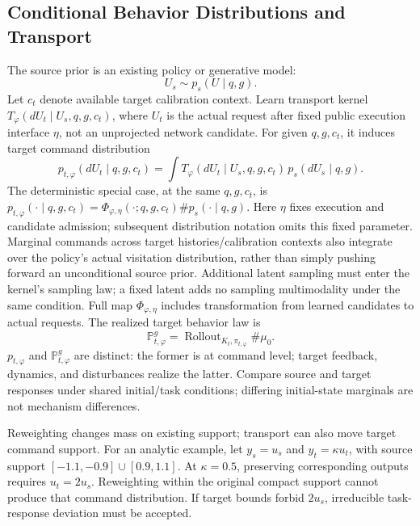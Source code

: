\documentclass[11pt]{article}
\begin{document}
\subsection{Conditional Behavior Distributions and Transport}
The source prior is an existing policy or generative model:
\begin{equation}
 U_s\sim p_s(U\mid q,g).
\end{equation}
Let $c_t$ denote available target calibration context. Learn transport kernel
$T_\varphi(dU_t\mid U_s,q,g,c_t)$, where $U_t$ is the actual request after fixed public
execution interface $\eta$, not an unprojected network candidate. For given $q,g,c_t$,
it induces target command distribution
\begin{equation}
 p_{t,\varphi}(dU_t\mid q,g,c_t)
 =\int T_\varphi(dU_t\mid U_s,q,g,c_t)\,p_s(dU_s\mid q,g).
 \label{eq:kerneltransport}
\end{equation}
The deterministic special case, at the same $q,g,c_t$, is
$p_{t,\varphi}(\cdot\mid q,g,c_t)
=\Phi_{\varphi,\eta}(\cdot;q,g,c_t)\#p_s(\cdot\mid q,g)$.
Here $\eta$ fixes execution and candidate admission; subsequent distribution notation
omits this fixed parameter. Marginal commands across target histories/calibration
contexts also integrate over the policy's actual visitation distribution, rather than
simply pushing forward an unconditional source prior. Additional latent sampling must
enter the kernel's sampling law; a fixed latent adds no sampling multimodality under
the same condition. Full map $\Phi_{\varphi,\eta}$ includes transformation from learned
candidates to actual requests. The realized target behavior law is
\begin{equation}
 \mathbb P_{t,\varphi}^{g}
 =\operatorname{Rollout}_{K_t,\pi_{t,\varphi}}\#\mu_0.
 \label{eq:pathlaw}
\end{equation}
$p_{t,\varphi}$ and $\mathbb P_{t,\varphi}^{g}$ are distinct: the former is at command
level; target feedback, dynamics, and disturbances realize the latter. Compare source
and target responses under shared initial/task conditions; differing initial-state
marginals are not mechanism differences.

Reweighting changes mass on existing support; transport can also move target command support. For an analytic example, let $y_s=u_s$ and $y_t=\kappa u_t$, with source support $[-1.1,-0.9]\cup[0.9,1.1]$. At $\kappa=0.5$, preserving corresponding outputs requires $u_t=2u_s$. Reweighting within the original compact support cannot produce that command distribution. If target bounds forbid $2u_s$, irreducible task-response deviation must be accepted.
\end{document}

